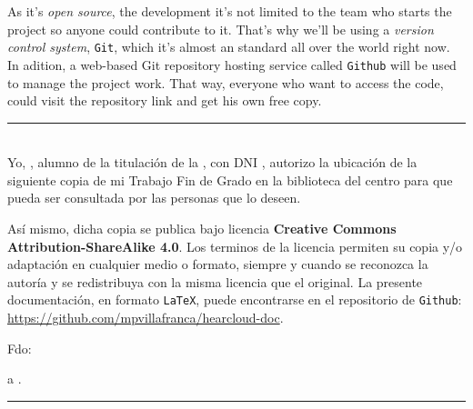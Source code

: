 As it's \textit{open source}, the development it's not limited to the team who starts the project so anyone could contribute to it. That's why we'll be using a \textit{version control system}, {\tt Git}, which it's almost an standard all over the world right now. In adition, a web-based Git repository hosting service called {\tt Github} will be used to manage the project work. That way, everyone who want to access the code, could visit the repository link and get his own free copy.

\newpage

\thispagestyle{empty}
\noindent\rule[-1ex]{\textwidth}{2pt}\\[4.5ex]

Yo, \textbf{\myName}, alumno de la titulación \myDegree{} de la \textbf{\myFaculty}, con DNI \myDNI, autorizo la
ubicación de la siguiente copia de mi Trabajo Fin de Grado en la biblioteca del centro para que pueda ser
consultada por las personas que lo deseen.

\bigskip
Así mismo, dicha copia se publica bajo licencia \textbf{Creative Commons Attribution-ShareAlike 4.0}. Los terminos de la licencia permiten su copia y/o adaptación en cualquier medio o formato, siempre y cuando se reconozca la autoría y se redistribuya con la misma licencia que el original. La presente documentación, en formato {\tt LaTeX}, puede encontrarse en el repositorio de {\tt Github}: \url{https://github.com/mpvillafranca/hearcloud-doc}.

\vspace{6cm}

\noindent Fdo: \myName

\vspace{2cm}

\begin{flushright}
\myLocation a \myTime.
\end{flushright}

\newpage


\thispagestyle{empty}
\noindent\rule[-1ex]{\textwidth}{2pt}\\[4.5ex]

